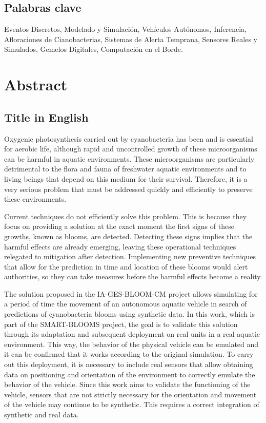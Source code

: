 \documentclass[11pt,a4paper]{book}
\begin{document}
\section*{Palabras clave}   
\noindent Eventos Discretos, Modelado y Simulación, Vehículos Autónomos, Inferencia, Afloraciones de Cianobacterias, Sistemas de Alerta Temprana, Sensores Reales y Simulados, Gemelos Digitales, Computación en el Borde.


\cleardoublepage   
\chapter*{Abstract}
\section*{Title in English}
Oxygenic photosynthesis carried out by cyanobacteria has been and is essential for aerobic life, although rapid and uncontrolled growth of these microorganisms can be harmful in aquatic environments. These microorganisms are particularly detrimental to the flora and fauna of freshwater aquatic environments and to living beings that depend on this medium for their survival. Therefore, it is a very serious problem that must be addressed quickly and efficiently to preserve these environments. 

Current techniques do not efficiently solve this problem. This is because they focus on providing a solution at the exact moment the first signs of these growths, known as blooms, are detected. Detecting these signs implies that the harmful effects are already emerging, leaving these operational techniques relegated to mitigation after detection. Implementing new preventive techniques that allow for the prediction in time and location of these blooms would alert authorities, so they can take measures before the harmful effects become a reality. 

The solution proposed in the IA-GES-BLOOM-CM project allows simulating for a period of time the movement of an autonomous aquatic vehicle in search of predictions of cyanobacteria blooms using synthetic data. In this work, which is part of the SMART-BLOOMS project, the goal is to validate this solution through its adaptation and subsequent deployment on real units in a real aquatic environment. This way, the behavior of the physical vehicle can be emulated and it can be confirmed that it works according to the original simulation. To carry out this deployment, it is necessary to include real sensors that allow obtaining data on positioning and orientation of the environment to correctly emulate the behavior of the vehicle. Since this work aims to validate the functioning of the vehicle, sensors that are not strictly necessary for the orientation and movement of the vehicle may continue to be synthetic. This requires a correct integration of synthetic and real data.
\end{document}
